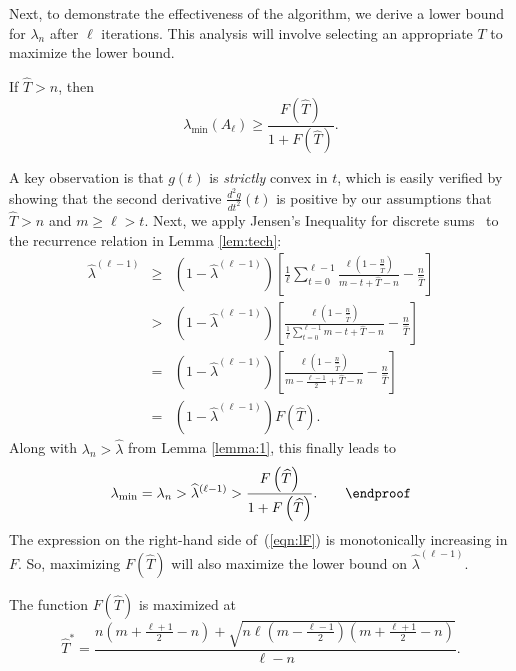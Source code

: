 \documentclass[final,leqno,onefignum,onetabnum]{siamltex1213}
\begin{document}
Next, to demonstrate the effectiveness of the algorithm, we derive a lower bound for $\lambda_n$ after $\ell$ iterations.  This analysis will
involve selecting an appropriate $T$ to maximize the lower bound.
\begin{lemma} \label{lem:lowbound}
If $\widehat{T} > n$, then 
\[ {\displaystyle \lambda_{\min} \left( A_{\ell} \right) \geq \frac{F \left( \widehat{T} \right)}{1+F \left( \widehat{T} \right)} }.\]
\end{lemma}
\proof A key observation is that $g(t)$ is \emph{strictly} convex in $t$,
which is easily verified by showing that the second derivative
$\frac{d^2g}{dt^2} (t)$ is positive by our assumptions that
$\widehat{T} > n$ and $m \geq \ell > t$. Next, we apply Jensen's
Inequality for discrete sums~\cite{zorich} to the recurrence relation in Lemma \ref{lem:tech}:
\begin{eqnarray}
{\displaystyle \widehat{\lambda}^{(\ell - 1)}}&\ge&{\displaystyle   \left(1-\widehat{\lambda}^{(\ell - 1)}\right) \left[\frac{1}{\ell}\sum_{t=0}^{\ell - 1}\frac{\ell \left(1-\frac{n}{\widehat{T}}\right)}{m-t+\widehat{T}-n}-\frac{n}{\widehat{T}}\right]}\nonumber\\
&>& {\displaystyle \left(1-\widehat{\lambda}^{(\ell - 1)}\right) \left[\frac{\ell \left(1-\frac{n}{\widehat{T}}\right)}{\frac{1}{\ell}\sum_{t=0}^{\ell - 1} m-t+\widehat{T}-n}-\frac{n}{ \widehat{T}}\right] } \nonumber\\
&=& {\displaystyle \left(1-\widehat{\lambda}^{(\ell - 1)}\right) \left[\frac{\ell \left(1-\frac{n}{\widehat{T}}\right)}{m-\frac{\ell - 1}{2}+\widehat{T}-n}-\frac{n}{\widehat{T}}\right]}\nonumber\\
&=&{\displaystyle \left(1-\widehat{\lambda}^{(\ell - 1)}\right)F\left(\widehat{T}\right)}.\nonumber
\end{eqnarray}
Along with $\lambda_n > \widehat{\lambda}$ from Lemma \ref{lemma:1},  this finally leads to 
\begin{eqnarray}
{\displaystyle \lambda_{\min} = \lambda_n > \widehat{\lambda}^{(\ell - 1)} > \frac{F\left(\widehat{T}\right)}{1+F\left(\widehat{T}\right)}.}\label{eqn:lF}
\hspace{2 em}\endproof
\end{eqnarray} 
The expression on the right-hand side of~(\ref{eqn:lF}) is monotonically increasing
in $F$. So, maximizing $F\left(\widehat{T}\right)$ will also
maximize the lower bound on $\widehat{\lambda}^{(\ell - 1)}$.
\begin{lemma} \label{lem:max}
The function $F(\widehat{T})$ is maximized at
\[ {\displaystyle \widehat{T}^* = \frac{n\left(m+\frac{\ell+1}{2}-n\right)+\sqrt{n \ell \left(m-\frac{\ell - 1}{2}\right)\left(m+\frac{\ell+1}{2}-n\right)}}{\ell - n} }.\]
\end{lemma}
\end{document}

